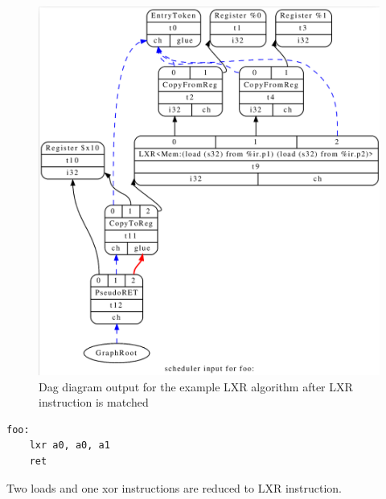 \begin{figure}
    \centering
    \includegraphics[scale=0.25]{adding_new_instr/lxr_match.png}
    \caption{Dag diagram output for the example LXR algorithm after LXR instruction is matched}
    \label{fig:lxr_match}
\end{figure}


\begin{lstlisting}[caption= Assembly output with LXR instruction]
foo:               
	lxr	a0, a0, a1
	ret
\end{lstlisting}

Two loads and one xor instructions are reduced to LXR instruction.

